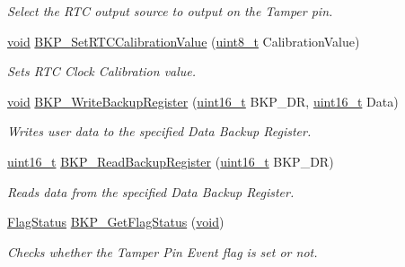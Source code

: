 \begin{DoxyCompactItemize}
\begin{DoxyCompactList}\small\item\em Select the R\+TC output source to output on the Tamper pin. \end{DoxyCompactList}\item 
\hyperlink{usb__devapi_8h_afabf60e7f57651d6d595a02c75f07cd0}{void} \hyperlink{group___b_k_p___private___functions_gad34db08a944450d2e7d56d0fd8db2bca}{B\+K\+P\+\_\+\+Set\+R\+T\+C\+Calibration\+Value} (\hyperlink{_p_e___types_8h_aba7bc1797add20fe3efdf37ced1182c5}{uint8\+\_\+t} Calibration\+Value)
\begin{DoxyCompactList}\small\item\em Sets R\+TC Clock Calibration value. \end{DoxyCompactList}\item 
\hyperlink{usb__devapi_8h_afabf60e7f57651d6d595a02c75f07cd0}{void} \hyperlink{group___b_k_p___private___functions_ga18d220387db651b3cb71fad5c092e041}{B\+K\+P\+\_\+\+Write\+Backup\+Register} (\hyperlink{_p_e___types_8h_a1f1825b69244eb3ad2c7165ddc99c956}{uint16\+\_\+t} B\+K\+P\+\_\+\+DR, \hyperlink{_p_e___types_8h_a1f1825b69244eb3ad2c7165ddc99c956}{uint16\+\_\+t} Data)
\begin{DoxyCompactList}\small\item\em Writes user data to the specified Data Backup Register. \end{DoxyCompactList}\item 
\hyperlink{_p_e___types_8h_a1f1825b69244eb3ad2c7165ddc99c956}{uint16\+\_\+t} \hyperlink{group___b_k_p___private___functions_ga359d8fbc945e0f4e34fedbe037d842c8}{B\+K\+P\+\_\+\+Read\+Backup\+Register} (\hyperlink{_p_e___types_8h_a1f1825b69244eb3ad2c7165ddc99c956}{uint16\+\_\+t} B\+K\+P\+\_\+\+DR)
\begin{DoxyCompactList}\small\item\em Reads data from the specified Data Backup Register. \end{DoxyCompactList}\item 
\hyperlink{agilefox_2library_2inc_2stm32f10x__type_8h_a89136caac2e14c55151f527ac02daaff}{Flag\+Status} \hyperlink{group___b_k_p___private___functions_gacc9aedde760383f0bd146f0d77a547db}{B\+K\+P\+\_\+\+Get\+Flag\+Status} (\hyperlink{usb__devapi_8h_afabf60e7f57651d6d595a02c75f07cd0}{void})
\begin{DoxyCompactList}\small\item\em Checks whether the Tamper Pin Event flag is set or not. \end{DoxyCompactList}\item 

\end{DoxyCompactItemize}

